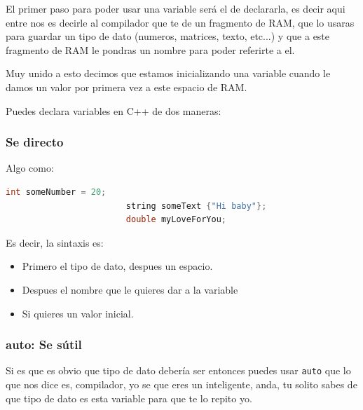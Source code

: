 \documentclass[12pt, fleqn]{report}                             %
\theoremstyle{break}                                            %
\begin{document}
                El primer paso para poder usar una variable será el de declararla, es decir
                aqui entre nos es decirle al compilador que te de un fragmento de RAM, que lo usaras
                para guardar un tipo de dato (numeros, matrices, texto, etc...) y que a este fragmento
                de RAM le pondras un nombre para poder referirte a el.

                Muy unido a esto decimos que estamos inicializando una variable cuando le damos
                un valor por primera vez a este espacio de RAM.

                Puedes declara variables en C++ de dos maneras:

                \subsubsection{Se directo}

                    Algo como:
                    \begin{lstlisting}[language=C++, gobble=20]
                        int someNumber = 20;
                        string someText {"Hi baby"};
                        double myLoveForYou;
                    \end{lstlisting}

                    Es decir, la sintaxis es:
                    \begin{itemize}
                        \item Primero el tipo de dato, despues un espacio.
                        \item Despues el nombre que le quieres dar a la variable
                        \item Si quieres un valor inicial.
                    \end{itemize} 

                \subsubsection{auto: Se sútil}

                    Si es que es obvio que tipo de dato debería ser entonces puedes usar \texttt{auto}
                    que lo que nos dice es, compilador, yo se que eres un inteligente, anda, 
                    tu solito sabes de que tipo de dato es esta variable para que te lo repito yo.
                    
\end{document}
